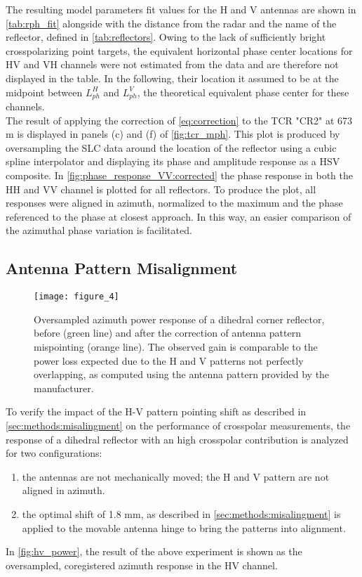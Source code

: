 The resulting model parameters fit values for the H and V antennas are shown in \autoref{tab:rph_fit} alongside with the distance from the radar and the name of the reflector, defined in \autoref{tab:reflectors}. Owing to the lack of sufficiently bright crosspolarizing point targets, the equivalent horizontal phase center locations for HV and VH channels were not estimated from the data and are therefore not displayed in the table. In the following, their location it assumed to be at the midpoint between $L_{ph}^{H}$ and $L_{ph}^{V}$, the theoretical equivalent phase center for these channels.\\
The result of applying the correction of \eqref{eq:correction} to the TCR "CR2" at 673 m is displayed in panels (c) and (f) of \autoref{fig:tcr_mph}. This plot is produced by oversampling the SLC data around the location of the reflector using a cubic spline interpolator and displaying its phase and amplitude response as a HSV composite.
In \autoref{fig:phase_response_VV:corrected} the phase response in both the HH and VV channel is plotted for all reflectors. To produce the plot, all responses were aligned in azimuth, normalized to the maximum and the phase referenced to the phase at closest approach. In this way, an easier comparison of the azimuthal phase variation is facilitated.
\subsection{Antenna Pattern Misalignment}\label{sec:results:misalignment}
\begin{figure}[Ht!]
	\centering
	\texttt{[image: figure\_4]}
	\caption{Oversampled azimuth power response of a dihedral corner reflector, before (green line) and after the correction of antenna pattern mispointing (orange line). The observed gain is comparable to the power loss expected due to the H and V patterns not perfectly overlapping, as computed using the antenna pattern provided by the manufacturer.}
	\label{fig:hv_power}
\end{figure}
To verify the impact of the H-V pattern pointing shift as described in \autoref{sec:methods:misalingment} on the performance of crosspolar measurements, the response of a dihedral reflector with an high crosspolar contribution is analyzed for two configurations:\\ 
\begin{enumerate}
	\item the antennas are not mechanically moved; the H and V pattern are not aligned in azimuth.
	\item the optimal shift of 1.8 mm, as described in \autoref{sec:methods:misalingment} is applied to the movable antenna hinge to bring the patterns into alignment.\\ 
\end{enumerate}
In \autoref{fig:hv_power}, the result of the above experiment is shown as the oversampled, coregistered azimuth response in the HV channel.
